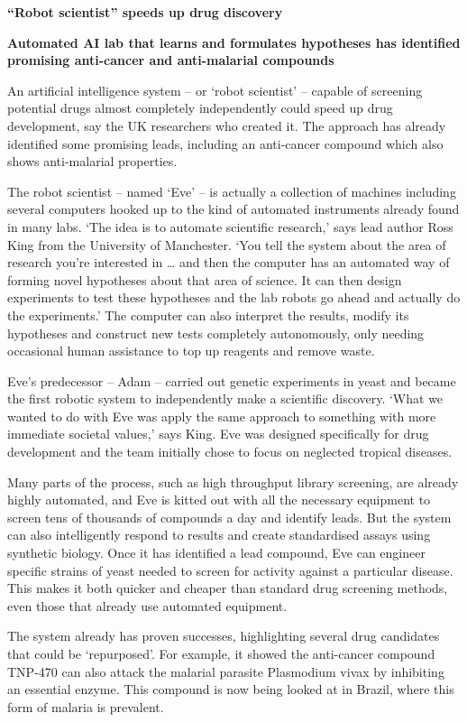 \documentclass[b5paper]{report}
\begin{document}
\begin{mybox}
\textbf{\Large ``Robot scientist'' speeds up drug discovery}

\textbf{Automated AI lab that learns and formulates hypotheses has identified
promising anti-cancer and anti-malarial compounds}

An artificial intelligence system – or ‘robot scientist’ – capable of screening
potential drugs almost completely independently could speed up drug
development, say the UK researchers who created it. The approach has already
identified some promising leads, including an anti-cancer compound which also
shows anti-malarial properties.

The robot scientist – named ‘Eve’ – is actually a collection of machines
including several computers hooked up to the kind of automated instruments
already found in many labs. ‘The idea is to automate scientific research,’ says
lead author Ross King from the University of Manchester. ‘You tell the system
about the area of research you’re interested in … and then the computer has an
automated way of forming novel hypotheses about that area of science. It can
then design experiments to test these hypotheses and the lab robots go ahead
and actually do the experiments.’ The computer can also interpret the results,
modify its hypotheses and construct new tests completely autonomously, only
needing occasional human assistance to top up reagents and remove waste.

Eve’s predecessor – Adam – carried out genetic experiments in yeast and became
the first robotic system to independently make a scientific discovery. ‘What we
wanted to do with Eve was apply the same approach to something with more
immediate societal values,’ says King. Eve was designed specifically for drug
development and the team initially chose to focus on neglected tropical
diseases.

Many parts of the process, such as high throughput library screening, are
already highly automated, and Eve is kitted out with all the necessary
equipment to screen tens of thousands of compounds a day and identify leads.
But the system can also intelligently respond to results and create
standardised assays using synthetic biology. Once it has identified a lead
compound, Eve can engineer specific strains of yeast needed to screen for
activity against a particular disease. This makes it both quicker and cheaper
than standard drug screening methods, even those that already use automated
equipment.

The system already has proven successes, highlighting several drug candidates
that could be ‘repurposed’. For example, it showed the anti-cancer compound
TNP-470 can also attack the malarial parasite Plasmodium vivax by inhibiting an
essential enzyme. This compound is now being looked at in Brazil, where this
form of malaria is prevalent.


\end{mybox}
\end{document}
